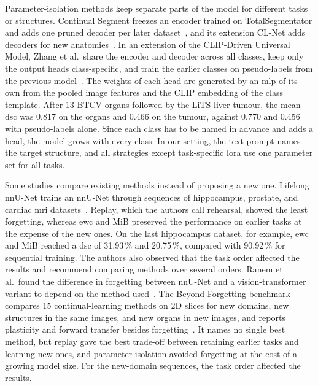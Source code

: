 Parameter-isolation methods keep separate parts of the model for different tasks or structures.
Continual Segment freezes an encoder trained on TotalSegmentator and adds one pruned decoder per later dataset~\cite{ji2023continualsegmentsingleunified}, and its extension CL-Net adds decoders for new anatomies~\cite{guo2025continuallearningdrivenmodelaccurate}.
In an extension of the CLIP-Driven Universal Model, Zhang et al.\ share the encoder and decoder across all classes, keep only the output heads class-specific, and train the earlier classes on pseudo-labels from the previous model~\cite{zhang2023continuallearningabdominalmultiorgan,liu2024universalextensible}.
The weights of each head are generated by an \gls{mlp} of its own from the pooled image features and the CLIP embedding of the class template.
After 13 BTCV organs followed by the LiTS liver tumour, the mean \gls{dsc} was 0.817 on the organs and 0.466 on the tumour, against 0.770 and 0.456 with pseudo-labels alone.
Since each class has to be named in advance and adds a head, the model grows with every class.
In our setting, the text prompt names the target structure, and all strategies except task-specific \gls{lora} use one parameter set for all tasks.

Some studies compare existing methods instead of proposing a new one.
Lifelong nnU-Net trains an nnU-Net through sequences of hippocampus, prostate, and cardiac \gls{mri} datasets~\cite{gonzalez2023lifelong}.
Replay, which the authors call rehearsal, showed the least forgetting, whereas \gls{ewc} and MiB preserved the performance on earlier tasks at the expense of the new ones.
On the last hippocampus dataset, for example, \gls{ewc} and MiB reached a \gls{dsc} of 31.93\,\% and 20.75\,\%, compared with 90.92\,\% for sequential training.
The authors also observed that the task order affected the results and recommend comparing methods over several orders.
Ranem et al.\ found the difference in forgetting between nnU-Net and a vision-transformer variant to depend on the method used~\cite{ranem2022continualhippocampussegmentationtransformers}.
The Beyond Forgetting benchmark compares 15 continual-learning methods on 2D slices for new domains, new structures in the same images, and new organs in new images, and reports plasticity and forward transfer besides forgetting~\cite{wang2026beyondforgetting}.
It names no single best method, but replay gave the best trade-off between retaining earlier tasks and learning new ones, and parameter isolation avoided forgetting at the cost of a growing model size.
For the new-domain sequences, the task order affected the results.

